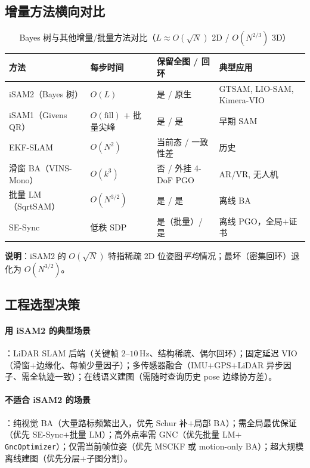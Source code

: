 \subsection{增量方法横向对比}
\label{sec:isam-horizontal}

\begin{table}[H]\centering\small
\caption{Bayes 树与其他增量/批量方法对比（$L\approx O(\sqrt N)$ 2D / $O(N^{2/3})$ 3D）}
\label{tab:methods-compare}
\begin{tabular}{lllp{}}
\toprule
方法 & 每步时间 & 保留全图 / 回环 & 典型应用 \\
\midrule
iSAM2（Bayes 树）\cite{kaess2012isam2} & $O(L)$ & 是 / 原生 & GTSAM, LIO-SAM, Kimera-VIO \\
iSAM1（Givens QR）\cite{kaess2008isam} & $O(\text{fill})$ $+$ 批量尖峰 & 是 / 是 & 早期 SAM \\
EKF-SLAM\cite{smith1986estimating} & $O(N^2)$ & 当前态 / 一致性差 & 历史 \\
滑窗 BA（VINS-Mono）\cite{qin2018vins} & $O(k^3)$ & 否 / 外挂 4-DoF PGO & AR/VR, 无人机 \\
批量 LM（SqrtSAM）\cite{dellaert2006square} & $O(N^{3/2})$ & 是 / 是 & 离线 BA \\
SE-Sync\cite{rosen2019sesync} & 低秩 SDP & 是（批量）/ 是 & 离线 PGO，全局$+$证书 \\
\bottomrule
\end{tabular}
\end{table}

\noindent\textbf{说明}：iSAM2 的 $O(\sqrt N)$ 特指稀疏 2D 位姿图\emph{平均}情况；最坏（密集回环）退化为 $O(N^{3/2})$。

\subsection{工程选型决策}
\label{sec:isam-decision}

\paragraph{用 iSAM2 的典型场景}：LiDAR SLAM 后端（关键帧 $2$--$10$\,Hz、结构稀疏、偶尔回环）；固定延迟 VIO（滑窗$+$边缘化、每帧少量因子）；多传感器融合（IMU$+$GPS$+$LiDAR 异步因子、需全轨迹一致）；在线语义建图（需随时查询历史 pose 边缘协方差）。

\paragraph{不适合 iSAM2 的场景}：纯视觉 BA（大量路标频繁出入，优先 Schur 补$+$局部 BA）；需全局最优保证（优先 SE-Sync$+$批量 LM）；高外点率需 GNC（优先批量 LM$+$\texttt{GncOptimizer}）；仅需当前帧位姿（优先 MSCKF 或 motion-only BA）；超大规模离线建图（优先分层$+$子图分割）。

